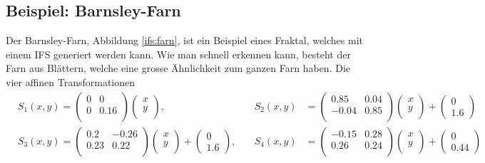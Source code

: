 \subsection{Beispiel: Barnsley-Farn}
Der Barnsley-Farn, Abbildung \ref{ifs:farn}, ist ein Beispiel eines Fraktal, welches mit einem IFS generiert werden kann.
Wie man schnell erkennen kann, besteht der Farn aus Blättern, welche eine grosse Ähnlichkeit zum ganzen Farn haben.
Die vier affinen Transformationen
\begin{align}
	& {S_1(x,y)}
	= 
	\begin{pmatrix}
		0 & 0 \\
		0 & 0.16 \\
	\end{pmatrix}
	\begin{pmatrix}
		x\\
		y\\
	\end{pmatrix}, \quad &
	{S_2(x,y)}
	&= 
	\begin{pmatrix}
		0.85 & 0.04 \\
		-0.04 & 0.85 \\
	\end{pmatrix}
	\begin{pmatrix}
		x\\
		y\\
	\end{pmatrix} 
	+
	\begin{pmatrix}
		0 \\
		1.6
	\end{pmatrix}\\
	& {S_3(x,y)}
	= 
	\begin{pmatrix}
		0.2 & -0.26 \\
		0.23 & 0.22 \\
	\end{pmatrix}
	\begin{pmatrix}
		x\\
		y\\
	\end{pmatrix} 
	+
	\begin{pmatrix}
		0 \\
		1.6
	\end{pmatrix}, \quad &
	{S_4(x,y)}
	&= 
	\begin{pmatrix}
		-0.15 & 0.28 \\
		0.26 & 0.24 \\
	\end{pmatrix}
	\begin{pmatrix}
		x\\
		y\\
	\end{pmatrix} 
	+
	\begin{pmatrix}
		0 \\
		0.44
	\end{pmatrix}\\
	\label{ifs:farnFormel}
\end{align}
